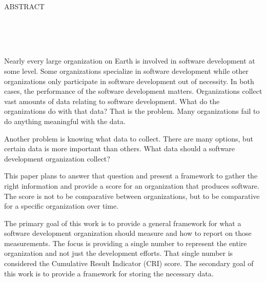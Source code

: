 \documentclass[SDSUThesis.tex]{subfiles}
\begin{document}
\newpage
\doublespacing

\begin{center}
ABSTRACT\\

\yourtitle \\
\yourname \\
\number\year\\
\end{center}

\par
Nearly every large organization on Earth is involved in software development at some level.  Some organizations
specialize in software development while other organizations only participate in software development out of
necessity. In both cases, the performance of the software development matters.  Organizations collect
vast amounts of data relating to software development.  What do the organizations do with that data? 
That is the problem.  Many organizations fail to do anything meaningful with the data.  

Another problem is knowing what data to collect.  There are many options, but certain data is more important than
others.  What data should a software development organization collect?

This paper plans to answer that question and present a framework to gather the 
right information and provide a score for an organization that
produces software.  The score is not to be comparative between organizations, but to be comparative for a specific
organization over time.  

The primary goal of this work is to provide a general framework for what a software development organization
should measure and how to report on those measurements.  The focus is providing a single number
to represent the entire
organization and not just the development efforts.  That single number is considered the 
Cumulative Result Indicator (CRI) score. The secondary goal of this work is to provide
a framework for storing the necessary data.
\end{document}
